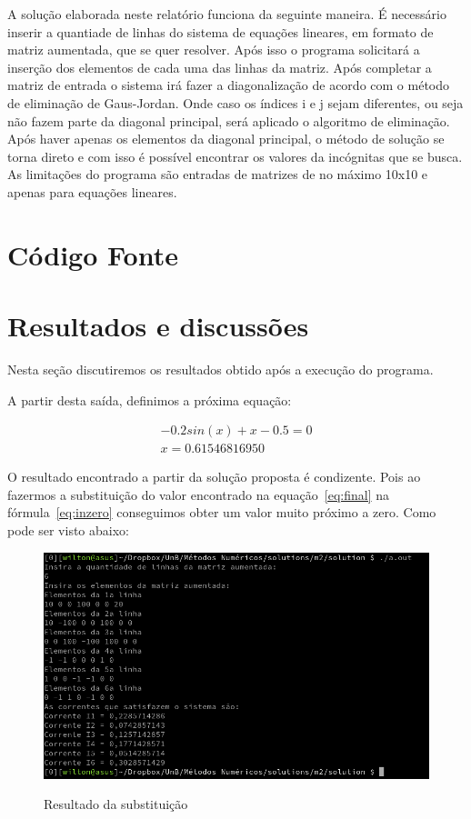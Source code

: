 \documentclass[12pt, hidelinks]{article}
\begin{document}
A solução elaborada neste relatório funciona da seguinte maneira. É necessário inserir a quantiade de linhas
do sistema de equações lineares, em formato de matriz aumentada, que se quer resolver. Após isso o programa
solicitará a inserção dos elementos de cada uma das linhas da matriz. Após completar a matriz de entrada o
sistema irá fazer a diagonalização de acordo com o método de eliminação de Gaus-Jordan. Onde caso os índices
i e j sejam diferentes, ou seja não fazem parte da diagonal principal, será aplicado o algoritmo de eliminação.
Após haver apenas os elementos da diagonal principal, o método de solução se torna direto e com isso é possível
encontrar os valores da incógnitas que se busca. As limitações do programa são entradas de matrizes de no máximo
10x10 e apenas para equações lineares.

\newpage
\section{Código Fonte}



\newpage
\section{Resultados e discussões}

Nesta seção discutiremos os resultados obtido após a execução do programa.

A partir desta saída, definimos a próxima equação:

\begin{eqnarray}\label{eq:final}
  -0.2sin(x) + x - 0.5 = 0 \nonumber\\
  x = 0.61546816950
\end{eqnarray}

O resultado encontrado a partir da solução proposta é condizente. Pois ao fazermos a substituição do valor
encontrado na equação~\eqref{eq:final} na fórmula~\eqref{eq:inzero} conseguimos obter um valor muito próximo a zero.
Como pode ser visto abaixo:

\begin{figure}[!h]
  \centering
  \includegraphics[width=15cm]{figuras/printx.png}\\
  \caption{Resultado da substituição}\label{fig:printx}
\end{figure}
\end{document}
